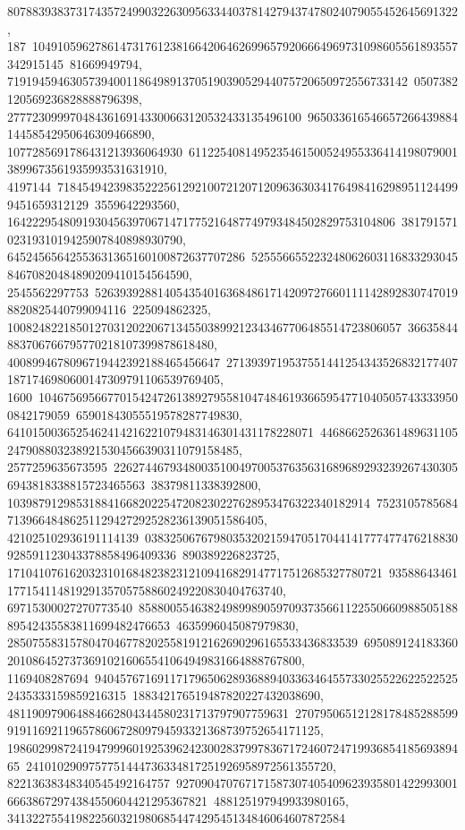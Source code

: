 {{{807883938373174357249903226309563344037814279437478024079055452645691322, 187\
10491059627861473176123816642064626996579206664969731098605561893557342915145\
81669949794, 7191945946305739400118649891370519039052944075720650972556733142\
0507382120569236828888796398, 27772309997048436169143300663120532433135496100\
96503361654665726643988414458542950646309466890, 1077285691786431213936064930\
61122540814952354615005249553364141980790013899673561935993531631910, 4197144\
71845494239835222561292100721207120963630341764984162989511244999451659312129\
3559642293560, 16422295480919304563970671471775216487749793484502829753104806\
3817915710231931019425907840898930790, 64524565642553631365160100872637707286\
52555665522324806260311683329304584670820484890209410154564590, 2545562297753\
52639392881405435401636848617142097276601111428928307470198820825440799094116\
225094862325, 100824822185012703120220671345503899212343467706485514723806057\
36635844883706766795770218107399878618480, 4008994678096719442392188465456647\
27139397195375514412543435268321774071871746980600147309791106539769405, 1600\
10467569566770154247261389279558104748461936659547710405057433339500842179059\
65901843055519578287749830, 6410150036525462414216221079483146301431178228071\
44686625263614896311052479088032389215304566390311079158485, 2577259635673595\
22627446793480035100497005376356316896892932392674303056943818338815723465563\
38379811338392800, 1039879129853188416682022547208230227628953476322340182914\
752310578568471396648486251129427292528236139051586405, 421025102936191114139\
03832506767980353202159470517044141777477476218830928591123043378858496409336\
890389226823725, 171041076162032310168482382312109416829147717512685327780721\
9358864346117715411481929135705758860249220830404763740, 69715300027270773540\
85880055463824989989059709373566112255066098850518889542435583811699482476653\
4635996045087979830, 28507558315780470467782025581912162690296165533436833539\
69508912418336020108645273736910216065541064949831664888767800, 1169408287694\
94045767169117179650628936889403363464557330255226225225252435333159859216315\
188342176519487820227432038690, 481190979064884662804344580231713797907759631\
2707950651212817848528859991911692119657860672809794593321368739752654171125, 
   19860299872419479996019253962423002837997836717246072471993685418569389465\
2410102909757751444736334817251926958972561355720, 82213638348340545492164757\
92709047076717158730740540962393580142299300166638672974384550604421295367821\
488125197949933980165, 341322755419822560321980685447429545134846064607872584\
}}}

